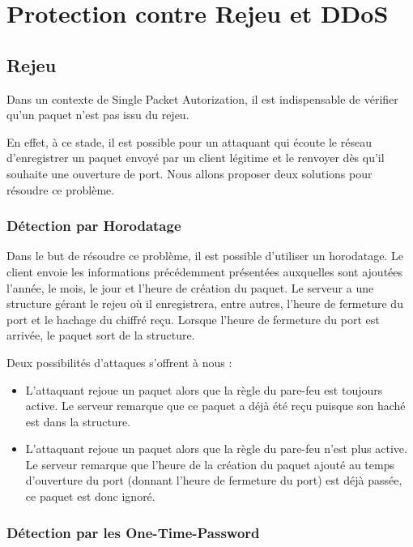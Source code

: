 \chapter{Protection contre Rejeu et DDoS}

\section{Rejeu}

Dans un contexte de Single Packet Autorization, il est indispensable de vérifier qu'un paquet n'est pas issu du rejeu.

En effet, à ce stade, il est possible pour un attaquant qui écoute le réseau d'enregistrer un paquet envoyé par un client légitime et le renvoyer dès qu'il souhaite une ouverture de port. Nous allons proposer deux solutions pour résoudre ce problème.

\subsection{Détection par Horodatage}

Dans le but de résoudre ce problème, il est possible d'utiliser un horodatage. Le client envoie les informations précédemment présentées auxquelles sont ajoutées l'année, le mois, le jour et l'heure de création du paquet. Le serveur a une structure gérant le rejeu où il enregistrera, entre autres, l'heure de fermeture du port et le hachage du chiffré reçu. Lorsque l'heure de fermeture du port est arrivée, le paquet sort de la structure.

Deux possibilités d'attaques s'offrent à nous :
\begin{itemize}
\item L'attaquant rejoue un paquet alors que la règle du pare-feu est toujours active. Le serveur remarque que ce paquet a déjà été reçu puisque son haché est dans la structure.
\item L'attaquant rejoue un paquet alors que la règle du pare-feu n'est plus active. Le serveur remarque que l'heure de la création du paquet ajouté au temps d'ouverture du port (donnant l'heure de fermeture du port) est déjà passée, ce paquet est donc ignoré.
\end{itemize}
\vspace{0.5cm}

\subsection{Détection par les \textbf{O}ne-\textbf{T}ime-\textbf{P}assword}

